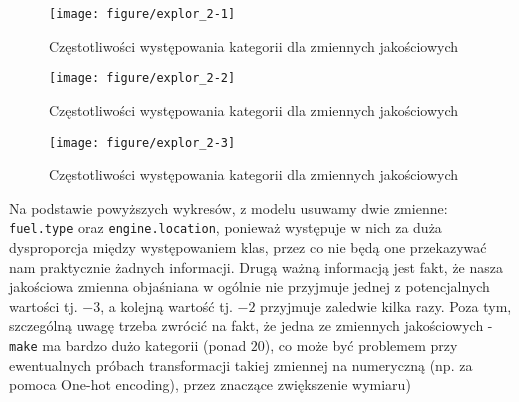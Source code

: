 \documentclass[12pt, a4paper]{article}\usepackage[]{graphicx}\usepackage[]{xcolor}
\makeatletter
\def\maxwidth{ %
  \ifdim\Gin@nat@width>\linewidth
    \linewidth
  \else
    \Gin@nat@width
  \fi
}
\newenvironment{knitrout}{}{} %
\makeatother
\begin{document}
\begin{knitrout}
\color{fgcolor}\begin{figure}[H]

{\centering \texttt{[image: figure/explor\_2-1]} 

}

\caption[Częstotliwości występowania kategorii dla zmiennych jakościowych]{Częstotliwości występowania kategorii dla zmiennych jakościowych}\label{fig:explor_2-1}
\end{figure}

\begin{figure}[H]

{\centering \texttt{[image: figure/explor\_2-2]} 

}

\caption[Częstotliwości występowania kategorii dla zmiennych jakościowych]{Częstotliwości występowania kategorii dla zmiennych jakościowych}\label{fig:explor_2-2}
\end{figure}

\begin{figure}[H]

{\centering \texttt{[image: figure/explor\_2-3]} 

}

\caption[Częstotliwości występowania kategorii dla zmiennych jakościowych]{Częstotliwości występowania kategorii dla zmiennych jakościowych}\label{fig:explor_2-3}
\end{figure}

\end{knitrout}

Na podstawie powyższych wykresów, z modelu usuwamy dwie zmienne: \texttt{fuel.type} oraz \texttt{engine.location}, ponieważ występuje w nich za duża dysproporcja między występowaniem klas, przez co nie będą one przekazywać nam praktycznie żadnych informacji. Drugą ważną informacją jest fakt, że nasza jakościowa zmienna objaśniana w ogólnie nie przyjmuje jednej z potencjalnych wartości tj. $-3$, a kolejną wartość tj. $-2$ przyjmuje zaledwie kilka razy. Poza tym, szczególną uwagę trzeba zwrócić na fakt, że jedna ze zmiennych jakościowych - \texttt{make} ma bardzo dużo kategorii (ponad $20$), co może być problemem przy ewentualnych próbach transformacji takiej zmiennej na numeryczną (np. za pomoca One-hot encoding), przez znaczące zwiększenie wymiaru)
\end{document}
